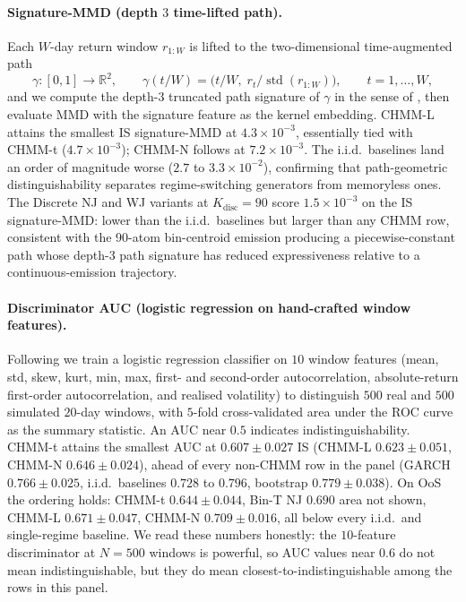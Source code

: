 \paragraph{Signature-MMD (depth $3$ time-lifted path).}
Each $W$-day return window $r_{1:W}$ is lifted to the two-dimensional time-augmented path
\begin{equation}
    \gamma: [0, 1] \to \mathbb{R}^2,
    \qquad \gamma(t/W) = \bigl( t/W,\; r_t / \operatorname{std}(r_{1:W}) \bigr),
    \qquad t = 1, \ldots, W,
    \label{eq:path_lift}
\end{equation}
and we compute the depth-$3$ truncated path signature of $\gamma$ in the sense of \citet{chevyrev2016primer}, then evaluate MMD with the signature feature as the kernel embedding.
CHMM-L attains the smallest IS signature-MMD at $4.3 \times 10^{-3}$, essentially tied with CHMM-t ($4.7 \times 10^{-3}$); CHMM-N follows at $7.2 \times 10^{-3}$.
The i.i.d.\ baselines land an order of magnitude worse ($2.7$ to $3.3 \times 10^{-2}$), confirming that path-geometric distinguishability separates regime-switching generators from memoryless ones.
The Discrete NJ and WJ variants at $K_{\text{disc}} = 90$ score $1.5 \times 10^{-3}$ on the IS signature-MMD: lower than the i.i.d.\ baselines but larger than any CHMM row, consistent with the 90-atom bin-centroid emission producing a piecewise-constant path whose depth-$3$ path signature has reduced expressiveness relative to a continuous-emission trajectory.

\paragraph{Discriminator AUC (logistic regression on hand-crafted window features).}
Following \citet{yoon2019timegan} we train a logistic regression classifier on $10$ window features (mean, std, skew, kurt, min, max, first- and second-order autocorrelation, absolute-return first-order autocorrelation, and realised volatility) to distinguish $500$ real and $500$ simulated $20$-day windows, with $5$-fold cross-validated area under the ROC curve as the summary statistic.
An AUC near $0.5$ indicates indistinguishability.
CHMM-t attains the smallest AUC at $0.607 \pm 0.027$ IS (CHMM-L $0.623 \pm 0.051$, CHMM-N $0.646 \pm 0.024$), ahead of every non-CHMM row in the panel (GARCH $0.766 \pm 0.025$, i.i.d.\ baselines $0.728$ to $0.796$, bootstrap $0.779 \pm 0.038$).
On OoS the ordering holds: CHMM-t $0.644 \pm 0.044$, Bin-T NJ $0.690$ area not shown, CHMM-L $0.671 \pm 0.047$, CHMM-N $0.709 \pm 0.016$, all below every i.i.d.\ and single-regime baseline.
We read these numbers honestly: the $10$-feature discriminator at $N = 500$ windows is powerful, so AUC values near $0.6$ do not mean indistinguishable, but they do mean closest-to-indistinguishable among the rows in this panel.

